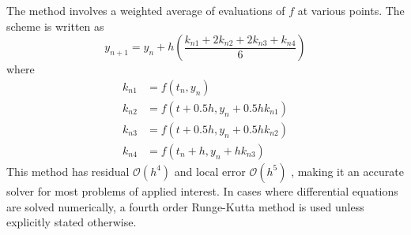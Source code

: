 The method involves a weighted average of evaluations of $ f $ at various points.  The scheme is written as 
%
\begin{equation}\label{RK}
y_{n+1} = y_n + h \left( \dfrac{k_{n1} + 2k_{n2} + 2k_{n3} + k_{n4}}{6}\right)
\end{equation}
%
where
\begin{align*}
k_{n1} &= f(t_n, y_n) \\
k_{n2} &= f(t+0.5h, y_n + 0.5hk_{n1}) \\
k_{n3} &= f(t + 0.5h, y_n + 0.5hk_{n2})\\
k_{n4} &= f(t_n + h, y_n + hk_{n3})
\end{align*}
%
This method has residual $ \mathcal{O}(h^4) $ and local error $ \mathcal{O}(h^5) $ \cite{corless2013graduate}, making it an accurate solver for most problems of applied interest.  In cases where differential equations are solved numerically, a fourth order Runge-Kutta method is used unless explicitly stated otherwise.